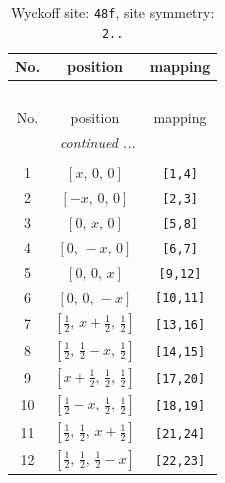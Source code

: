 \documentclass[fleqn,8pt]{jsarticle}
\begin{document}
\begin{longtable}{ccc}
\caption{Wyckoff site: {\tt 48f}, site symmetry: {\tt 2..}}
 \\
 \hline \hline
No. & position & mapping \\ \hline \endfirsthead

\multicolumn{2}{l}{\tablename\ \thetable{}} \\
 \hline \hline
No. & position & mapping \\ \hline \endhead

 \hline \hline
\multicolumn{2}{r}{\footnotesize\it continued ...} \\ \endfoot

 \hline \hline
\multicolumn{2}{r}{} \\ \endlastfoot

1 & $\left[ x,\, 0,\, 0 \right]$ & {\tt [1,4]} \\ \hline
2 & $\left[ - x,\, 0,\, 0 \right]$ & {\tt [2,3]} \\ \hline
3 & $\left[ 0,\, x,\, 0 \right]$ & {\tt [5,8]} \\ \hline
4 & $\left[ 0,\, - x,\, 0 \right]$ & {\tt [6,7]} \\ \hline
5 & $\left[ 0,\, 0,\, x \right]$ & {\tt [9,12]} \\ \hline
6 & $\left[ 0,\, 0,\, - x \right]$ & {\tt [10,11]} \\ \hline
7 & $\left[ \frac{1}{2},\, x + \frac{1}{2},\, \frac{1}{2} \right]$ & {\tt [13,16]} \\ \hline
8 & $\left[ \frac{1}{2},\, \frac{1}{2} - x,\, \frac{1}{2} \right]$ & {\tt [14,15]} \\ \hline
9 & $\left[ x + \frac{1}{2},\, \frac{1}{2},\, \frac{1}{2} \right]$ & {\tt [17,20]} \\ \hline
10 & $\left[ \frac{1}{2} - x,\, \frac{1}{2},\, \frac{1}{2} \right]$ & {\tt [18,19]} \\ \hline
11 & $\left[ \frac{1}{2},\, \frac{1}{2},\, x + \frac{1}{2} \right]$ & {\tt [21,24]} \\ \hline
12 & $\left[ \frac{1}{2},\, \frac{1}{2},\, \frac{1}{2} - x \right]$ & {\tt [22,23]} \\
\end{longtable}
\renewcommand{\arraystretch}{1.2}
\end{document}
